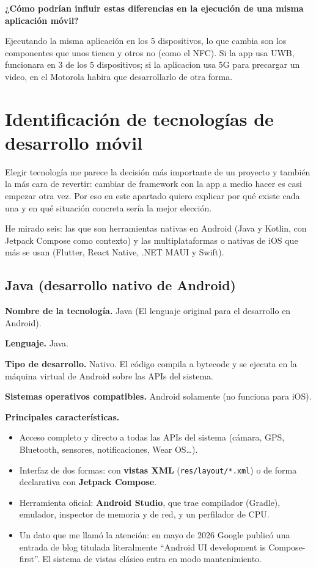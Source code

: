 \documentclass[11pt,a4paper]{article}
\newcommand{\code}[1]{\texttt{\color{primary}#1}}
\newcommand{\campo}[1]{\textbf{\color{primary}#1}}
\begin{document}
	\campo{¿Cómo podrían influir estas diferencias en la ejecución de una misma aplicación móvil?}
	
	Ejecutando la misma aplicación en los 5 dispositivos, lo que cambia son los componentes que unos tienen y otros no (como el NFC). Si la app usa UWB, funcionara en 3 de los 5 dispositivos; si la aplicacion usa 5G para precargar un video, en el Motorola habira que desarrollarlo de otra forma.
	
	\section{Identificación de tecnologías de desarrollo móvil}
	
	Elegir tecnología me parece la decisión más importante de un proyecto y también la más cara de revertir: cambiar de framework con la app a medio hacer es casi empezar otra vez. Por eso en este apartado quiero explicar por qué existe cada una y en qué situación concreta sería la mejor elección.
	
	He mirado seis: las que son herramientas nativas en Android (Java y Kotlin, con Jetpack Compose como contexto) y las multiplataformas o nativas de iOS que más se usan (Flutter, React Native, .NET MAUI y Swift).
	
	\subsection{Java (desarrollo nativo de Android)}
	
  \campo{Nombre de la tecnología.} Java (El lenguaje original para el desarrollo en Android).
	
	\campo{Lenguaje.} Java.
	
	\campo{Tipo de desarrollo.} Nativo. El código compila a bytecode y se ejecuta en la máquina virtual de Android sobre las APIs del sistema.
	
	\campo{Sistemas operativos compatibles.} Android solamente (no funciona para iOS).
	
	\campo{Principales características.}
	\begin{itemize}[leftmargin=*,itemsep=0.2em,topsep=0.2em]
		\item Acceso completo y directo a todas las APIs del sistema (cámara, GPS, Bluetooth, sensores, notificaciones, Wear OS\ldots).
		\item Interfaz de dos formas: con \textbf{vistas XML} (\code{res/layout/*.xml}) o de forma declarativa con \textbf{Jetpack Compose}.
		\item Herramienta oficial: \textbf{Android Studio}, que trae compilador (Gradle), emulador, inspector de memoria y de red, y un perfilador de CPU.
		\item Un dato que me llamó la atención: en mayo de 2026 Google publicó una entrada de blog titulada literalmente \enquote{Android UI development is Compose-first}. El sistema de vistas clásico entra en modo mantenimiento.
	\end{itemize}
	
\end{document}
